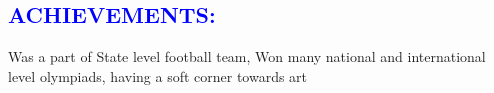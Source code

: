 \documentclass{article}
\begin{document}
\begin{multicols}{2}
\vspace{5pt}
\section*{\large{\textcolor{blue}{\uppercase{achievements:}}}}

\begin{flushleft}
	Was a part of State level football team, Won many national and international level olympiads, having a soft corner towards art
\end{flushleft}
\vspace{5pt}

\end{multicols}
\end{document}
